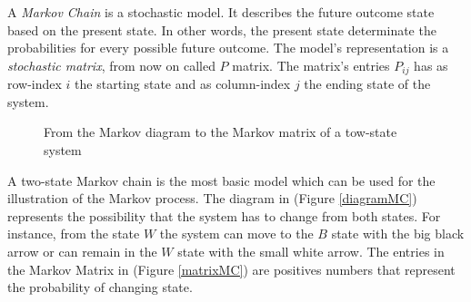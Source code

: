 \documentclass[class=article, crop=false]{standalone}
\begin{document}
\label{chap:MarkovChain}
A \emph{Markov Chain} is a stochastic model.
It describes the future outcome state based on the present state.
In other words, the present state determinate the probabilities for every possible future outcome.
The model's representation is a \emph{stochastic matrix}, from now on called $P$ matrix.
The matrix's entries $P_{ij}$ has as row-index $i$ the starting state and as column-index $j$ the ending state of the system.

\begin{figure}[h]
    \centering
    \quad\quad
    \caption{From the Markov diagram to the Markov matrix of a tow-state system}
    \label{MarkovMatrix}
\end{figure}
A two-state Markov chain is the most basic model which can be used for the illustration of the Markov process.
The diagram in (Figure \ref{diagramMC}) represents the possibility that the system has to change from both states.
For instance, from the state $W$ the system can move to the $B$ state with the big black arrow or can remain in the $W$ state with the small white arrow.
The entries in the Markov Matrix in (Figure \ref{matrixMC}) are positives numbers that represent the probability of changing state.
\end{document}
